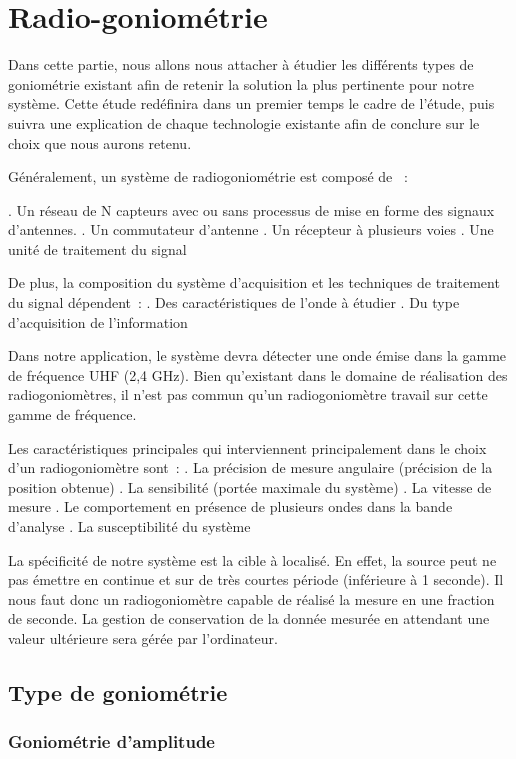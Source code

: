 \chapter{Radio-goniométrie}



Dans cette partie, nous allons nous attacher à étudier les différents types de goniométrie existant afin de retenir la solution la plus pertinente pour notre système. Cette étude redéfinira dans un premier temps le cadre de l’étude, puis suivra une explication de chaque technologie existante afin de conclure sur le choix que nous aurons retenu.


Généralement, un système de radiogoniométrie est composé de  :

. Un réseau de N capteurs avec ou sans processus de mise en forme des signaux d’antennes.
	. Un commutateur d’antenne
	. Un récepteur à plusieurs voies
	. Une unité de traitement du signal

De plus, la composition du système d’acquisition et les techniques de traitement du signal dépendent :
	.  Des caractéristiques de l’onde à étudier
	.  Du type d’acquisition de l’information

Dans notre application, le système devra détecter une onde émise dans la gamme de fréquence UHF (2,4 GHz). Bien qu’existant dans le domaine de réalisation des radiogoniomètres, il n’est pas commun qu’un radiogoniomètre travail sur cette gamme de fréquence.

Les caractéristiques principales qui interviennent principalement dans le choix d’un radiogoniomètre sont :
	. La précision de mesure angulaire (précision de la position obtenue)
	. La sensibilité (portée maximale du système) 
	. La vitesse de mesure
	. Le comportement en présence de plusieurs ondes dans la bande d’analyse
	. La susceptibilité du système


La spécificité de notre système est la cible à localisé. En effet, la source peut ne pas émettre en  continue et sur de très courtes période (inférieure à 1 seconde). Il nous faut donc un radiogoniomètre capable de réalisé la mesure en une fraction de seconde. La gestion de conservation de la donnée mesurée en attendant une valeur ultérieure sera gérée par l’ordinateur.


\section{Type de goniométrie}

\subsection{Goniométrie d'amplitude}

